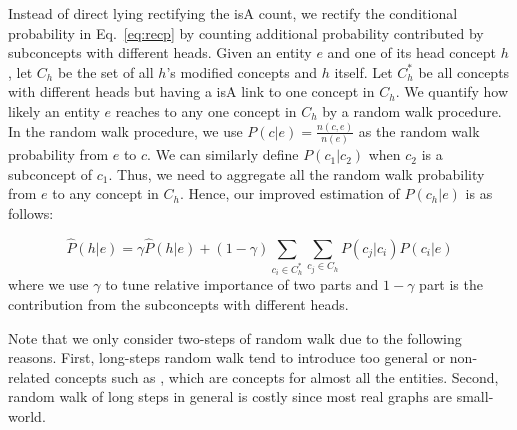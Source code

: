 Instead of direct lying rectifying the isA count, we rectify the conditional probability in Eq.~\ref{eq:recp} by counting additional probability contributed by subconcepts with different heads. Given an entity $e$ and one of its head concept $h$, let $C_h$ be the set of all $h$'s modified concepts and $h$ itself. Let $C^*_h$ be all concepts with different heads but having a isA link to one concept in $C_h$. We quantify how likely an entity $e$ reaches to any one concept in $C_h$ by a random walk procedure. In the random walk procedure, we use $P(c|e)=\frac{n(c,e)}{n(e)}$ as the random walk probability from $e$ to $c$. We can similarly define $P(c_1|c_2)$ when $c_2$ is a subconcept of $c_1$.  Thus, we need to aggregate all the random walk probability from $e$ to any concept in $C_h$.
Hence, our improved estimation of $P({c_h}|e)$ is as follows:

\begin{equation}
\hat{P}({h}|e) = \gamma \hat{P}({h}|e)+ (1-\gamma) \sum_{c_i\in C^*_h}\sum_{ c_j\in C_h} P(c_j|c_i) P(c_i|e)
\label{eq:pgge}
\end{equation}
where we use $\gamma$ to tune relative importance of two parts and $1-\gamma$ part is the contribution from the subconcepts with different heads.


Note that we only consider two-steps of random walk due to the following reasons.
First, long-steps random walk tend to introduce too general or non-related concepts such as , which are concepts for almost all the entities.
Second, random walk of long steps in general is costly since most real graphs are small-world.

%
%

